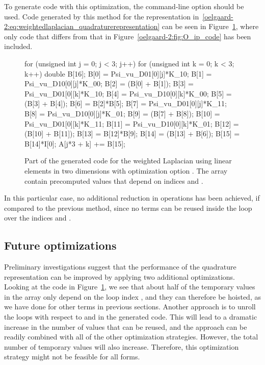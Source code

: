 To generate code with this optimization, the \ffc{}
command-line option  should
be used.  Code generated by this method for the representation
in~\eqref{oelgaard-2:eq:weightedlaplacian_quadraturerepresentation}
can be seen in Figure~\ref{oelgaard-2:fig:O_basis_code}, where only
code that differs from that in Figure~\ref{oelgaard-2:fig:O_ip_code}
has been included.
%
\begin{figure}
\begin{c++}
for (unsigned int j = 0; j < 3; j++)
{
  for (unsigned int k = 0; k < 3; k++)
  {
    double B[16];
    B[0] = Psi_vu_D01[0][j]*K_10;
    B[1] = Psi_vu_D10[0][j]*K_00;
    B[2] = (B[0] + B[1]);
    B[3] = Psi_vu_D01[0][k]*K_10;
    B[4] = Psi_vu_D10[0][k]*K_00;
    B[5] = (B[3] + B[4]);
    B[6] = B[2]*B[5];
    B[7] = Psi_vu_D01[0][j]*K_11;
    B[8] = Psi_vu_D10[0][j]*K_01;
    B[9] = (B[7] + B[8]);
    B[10] = Psi_vu_D01[0][k]*K_11;
    B[11] = Psi_vu_D10[0][k]*K_01;
    B[12] = (B[10] + B[11]);
    B[13] = B[12]*B[9];
    B[14] = (B[13] + B[6]);
    B[15] = B[14]*I[0];
    A[j*3 + k] += B[15];
  }
}
\end{c++}
\caption{Part of the generated code for the weighted Laplacian using
         linear elements in two dimensions with optimization option
         . The array  contain
         precomputed values that depend on indices  and .}
\label{oelgaard-2:fig:O_basis_code}
\end{figure}
%
In this particular case, no additional reduction in operations has been
achieved, if compared to the previous method, since no terms can be
reused inside the loop over the indices  and .
\subsection{Future optimizations}

Preliminary investigations suggest that the performance of the quadrature
representation can be improved by applying two additional optimizations.
Looking at the code in Figure~\ref{oelgaard-2:fig:O_basis_code}, we see
that about half of the temporary values in the array  only depend
on the loop index , and they can therefore be hoisted, as we have
done for other terms in previous sections.  Another approach is to unroll
the loops with respect to  and  in the generated code.
This will lead to a dramatic increase in the number of values that can be
reused, and the approach can be readily combined with all of the other
optimization strategies. However, the total number of temporary values
will also increase. Therefore, this optimization strategy might not be
feasible for all forms.


